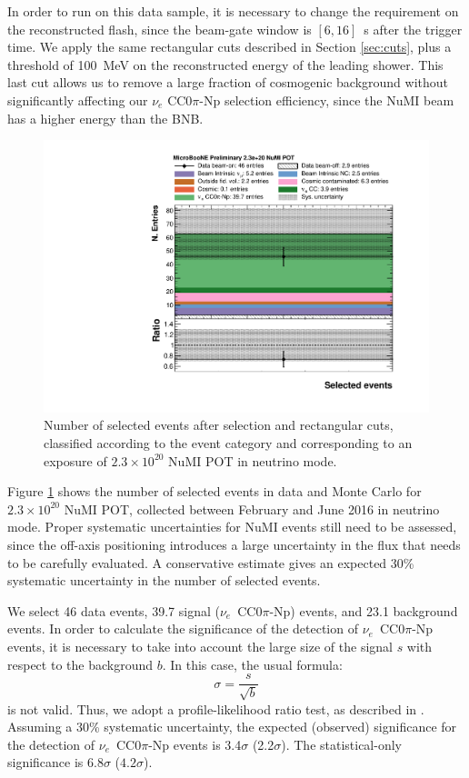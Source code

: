 In order to run on this data sample, it is necessary to change the requirement on the reconstructed flash, since the beam-gate window is $[6,16]$~\si{\micro}s after the trigger time.
We apply the same rectangular cuts described in Section \ref{sec:cuts}, plus a threshold of 100~MeV on the reconstructed energy of the leading shower. This last cut allows us to remove a large fraction of cosmogenic background without significantly affecting our $\nu_e$ CC0$\pi$-Np selection efficiency, since the NuMI beam has a higher energy than the BNB.

\begin{figure}[htbp]
\centering
  \includegraphics[width=0.75\linewidth]{figures/numi_events.pdf}
  \caption{Number of selected events after selection and rectangular cuts, classified according to the event category and corresponding to an exposure of $2.3\times10^{20}$ NuMI POT in neutrino mode.}\label{fig:numi_nue}
\end{figure}

Figure \ref{fig:numi_nue} shows the number of selected events in data and Monte Carlo for $2.3\times10^{20}$ NuMI POT, collected between February and June 2016 in neutrino mode. Proper systematic uncertainties for NuMI events still need to be assessed, since the off-axis positioning introduces a large uncertainty in the flux that needs to be carefully evaluated. A conservative estimate gives an expected 30\% systematic uncertainty in the number of selected events.

We select 46 data events, 39.7 signal ($\nu_e$~CC0$\pi$-Np) events, and 23.1 background events. In order to calculate the significance of the detection of $\nu_e$~CC0$\pi$-Np events, it is necessary to take into account the large size of the signal $s$ with respect to the background $b$. In this case, the usual formula:
\begin{equation}
    \sigma = \frac{s}{\sqrt{b}}
\end{equation}
is not valid. Thus, we adopt a profile-likelihood ratio test, as described in \cite{Cowan:2010js}.
Assuming a 30\% systematic uncertainty, the expected (observed) significance for the detection of $\nu_e$~CC0$\pi$-Np events is 3.4$\sigma$ (2.2$\sigma$). The statistical-only significance is $6.8\sigma$ ($4.2\sigma$).

